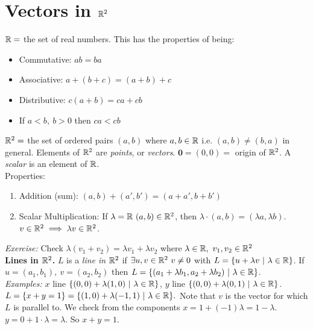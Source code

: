\setcounter{lecture}{1}
 \section{Vectors in $\mathbb{R}^2$}

 $\mathbb{R} =$ the set of real numbers.  This has the properties of being:\begin{itemize}
\item Commutative: $ab = ba$
\item Associative: $a+(b+c) = (a+b) + c	$
\item Distributive: $c(a+b) = ca + cb$
\item If $a<b,~b>0$ then $ca < cb$
\end{itemize}

$\mathbb{R}^2 = $ the set of ordered pairs $(a,b)$ where $a,b \in \mathbb{R}$ i.e. $(a,b) \neq (b,a)$ in general. Elements of $\mathbb{R}^2$ are \emph{points}, or \emph{vectors}. $\mathbf{0} = (0,0) = $ origin of $\mathbb{R}^2$. A \emph{scalar} is an element of $\mathbb{R}$.\\

Properties:\begin{enumerate}
\item Addition (sum): $(a,b) + (a',b') = (a+a',b+b')$%
\item Scalar Multiplication: If $\lambda = \mathbb{R}~ (a,b) \in \mathbb{R}^2$, then $\lambda \cdot (a,b) = (\lambda a,\lambda b)$. $v \in \mathbb{R}^2 \implies \lambda v \in \mathbb{R}^2$.	
\end{enumerate}
\textit{Exercise:} Check $\lambda(v_1+v_2) = \lambda v_1 + \lambda v_2$ where $\lambda \in \mathbb{R},~ v_1,v_2 \in \mathbb{R}^2$\\

\noindent \textbf{Lines in $\mathbb{R}^2$.} $L$ is a \emph{line in $\mathbb{R}^2$} if $\exists u, v \in \mathbb{R}^2~ v \neq 0$ with $L = \{u + \lambda v ~|~ \lambda \in \mathbb{R}\}$. If $u = (a_1,b_1),~v = (a_2,b_2)$ then $L = \{(a_1 + \lambda b_1, a_2 + \lambda b_2) ~|~ \lambda \in \mathbb{R}\}$. \\ %

\textit{Examples:} $x$ line $\{(0,0) + \lambda(1,0) ~|~ \lambda \in \mathbb{R}\}$, $y$ line $\{(0,0) + \lambda (0,1) ~|~ \lambda \in \mathbb{R}\}$. $L = \{x+y = 1\} = \{(1,0) + \lambda(-1,1) ~|~ \lambda \in \mathbb{R}\}.$ Note that $v$ is the vector for which $L$ is parallel to. We check from the components $x = 1 + (-1) \lambda = 1 - \lambda$. $y = 0 + 1 \cdot \lambda = \lambda$. So $x + y = 1$.\\

